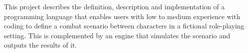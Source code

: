 This project describes the definition, description and implementation of a programming language that enables users with low to medium experience with coding to define a combat scenario between characters in a fictional role-playing setting. This is complemented by an engine that simulates the scenario and outputs the results of it.

